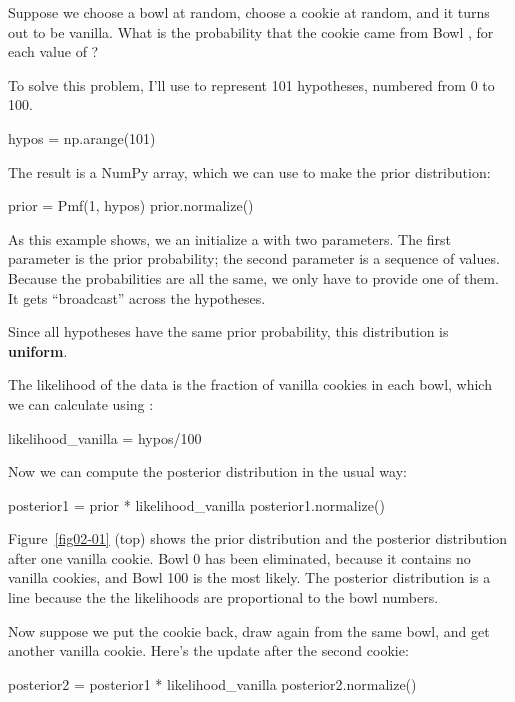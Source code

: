 \documentclass[12pt]{book}
\theoremstyle{exercise}
\begin{document}
Suppose we choose a bowl at random, choose a cookie at random, and it turns out to be vanilla.  What is the probability that the cookie came from Bowl , for each value of ?

To solve this problem, I'll use  to represent 101 hypotheses, numbered from 0 to 100.

\begin{code}
hypos = np.arange(101)
\end{code}

The result is a NumPy array, which we can use to make the prior distribution:

\begin{code}
prior = Pmf(1, hypos)
prior.normalize()
\end{code}

As this example shows, we an initialize a  with two parameters.
The first parameter is the prior probability; the second parameter is a sequence of values.
Because the probabilities are all the same, we only have to provide one of them.
It gets ``broadcast'' across the hypotheses.

Since all hypotheses have the same prior probability, this distribution is {\bf uniform}.

The likelihood of the data is the fraction of vanilla cookies in each bowl, which we can calculate using :

\begin{code}
likelihood_vanilla = hypos/100
\end{code}

Now we can compute the posterior distribution in the usual way:

\begin{code}
posterior1 = prior * likelihood_vanilla
posterior1.normalize()
\end{code}

Figure~\ref{fig02-01} (top) shows the prior distribution and the posterior distribution after one vanilla cookie.
Bowl 0 has been eliminated, because it contains no vanilla cookies, and Bowl 100 is the most likely.
The posterior distribution is a line because the the likelihoods are proportional to the bowl numbers.

Now suppose we put the cookie back, draw again from the same bowl, and get another vanilla cookie.
Here's the update after the second cookie:

\begin{code}
posterior2 = posterior1 * likelihood_vanilla
posterior2.normalize()
\end{code}
\end{document}
